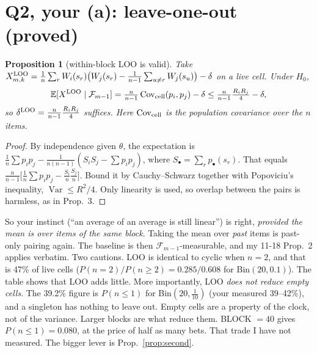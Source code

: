 \documentclass[11pt]{article}
\newtheorem{proposition}{Proposition}
\newcommand{\E}{\mathbb{E}}
\newcommand{\Cov}{\operatorname{Cov}}
\newcommand{\Fc}{\mathcal{F}}
\begin{document}
\section{Q2, your (a): leave-one-out (proved)}
\begin{proposition}[within-block LOO is valid]\label{prop:loo}
Take $X^{\rm LOO}_{m,k}=\frac1n\sum_rW_i(s_r)\big(W_j(s_r)-\frac1{n-1}\sum_{u\ne r}W_j(s_u)\big)-\delta$ on a live cell. Under $H_0$,
\[\E[X^{\rm LOO}\mid\Fc_{m-1}]=\tfrac{n}{n-1}\Cov_{\rm cell}(p_i,p_j)-\delta\le\tfrac{n}{n-1}\tfrac{R_iR_j}{4}-\delta ,\]
so $\delta^{\rm LOO}=\frac{n}{n-1}\frac{R_iR_j}4$ suffices. Here $\Cov_{\rm cell}$ is the population covariance over the $n$ items.
\end{proposition}
\begin{proof}
By independence given $\theta$, the expectation is $\frac1n\sum p_ip_j-\frac1{n(n-1)}(S_iS_j-\sum p_ip_j)$, where $S_\bullet=\sum_r p_\bullet(s_r)$. That equals $\frac n{n-1}\big[\frac1n\sum p_ip_j-\frac{S_i}n\frac{S_j}n\big]$.
Bound it by Cauchy--Schwarz together with Popoviciu's inequality, $\operatorname{Var}\le R^2/4$. Only linearity is used, so overlap between the pairs is harmless, as in Prop.~3.
\end{proof}
So your instinct (``an average of an average is still linear'') is right, \emph{provided the mean is over items of the same block}. Taking the mean over \emph{past} items is past-only pairing again. The baseline is then $\Fc_{m-1}$-measurable, and my 11-18 Prop.~2 applies verbatim.
Two cautions. LOO is identical to cyclic when $n=2$, and that is 47\% of live cells ($P(n=2)/P(n\ge2)=0.285/0.608$ for Bin$(20,0.1)$). The table shows that LOO adds little.
More importantly, LOO \emph{does not reduce empty cells}. The 39.2\% figure is $P(n\le1)$ for Bin$(20,\tfrac1{10})$ (your measured 39--42\%), and a singleton has nothing to leave out. Empty cells are a property of the clock, not of the variance.
Larger blocks are what reduce them. BLOCK $=40$ gives $P(n\le1)=0.080$, at the price of half as many bets. That trade I have not measured.
The bigger lever is Prop.~\ref{prop:second}.
\end{document}
